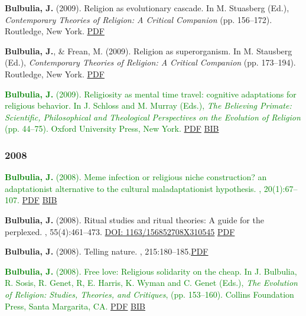 \documentclass{article}
\begin{document}
\begin{thebibliography}{99}
{\bf Bulbulia, J.} (2009).
\newblock Religion as evolutionary cascade.
\newblock In M. Stuasberg (Ed.), {\em Contemporary Theories of Religion: A
  Critical Companion} (pp. 156--172). Routledge, New York. \href{http://db.tt/OLFGqFk}{PDF}


{\bf Bulbulia, J.}, \& Frean, M. (2009).
\newblock Religion as superorganism.
\newblock In M. Stausberg (Ed.), {\em Contemporary Theories of Religion: A
  Critical Companion} (pp. 173--194). Routledge, New York. \href{http://db.tt/LMShwLD}{PDF}


\textcolor{Green}{{\bf Bulbulia, J.} (2009).
\newblock Religiosity as mental time travel: cognitive adaptations for
  religious behavior.
\newblock In J. Schloss and M. Murray (Eds.), {\em The Believing Primate:
  Scientific, Philosophical and Theological Perspectives on the Evolution of
  Religion} (pp. 44--75). Oxford University Press, New York. } \href{http://db.tt/gGUysok}{PDF} \href{https://www.dropbox.com/s/ri6hs7gbut6ku1f/2009.mentalTime.bib?dl=0}{BIB}



\subsubsection*{2008}




 \textcolor{Green}{{\bf Bulbulia, J.} (2008).
\newblock Meme infection or religious niche construction? an adaptationist
  alternative to the cultural maladaptationist hypothesis.
, 20(1):67--107.} \href{http://db.tt/6IjKsQV}{PDF} \href{https://scholar.google.co.nz/scholar.bib?q=info:7ZPnl0WG0EkJ:scholar.google.com/&output=citation&scisig=AAGBfm0AAAAAVQSUw7EcGrYvW0TZ0foofELIVjbg3S2W&scisf=4&hl=en}{BIB}


{\bf Bulbulia, J.} (2008).
\newblock Ritual studies and ritual theories: A guide for the perplexed.
, 55(4):461--473.  
\href{https://doi.org/1163/156852708X310545}{DOI: 1163/156852708X310545} \href{http://booksandjournals.brillonline.com/content/journals/10.1163/156852708x310545}{PDF}


{\bf Bulbulia, J.} (2008).
\newblock Telling nature.
, 215:180--185.\href{http://db.tt/MCbgvBt}{PDF}


\textcolor{Green}{
{\bf Bulbulia, J.} (2008).
\newblock Free love: Religious solidarity on the cheap.
\newblock In J. Bulbulia, R. Sosis, R. Genet, R, E. Harris, K. Wyman and
  C. Genet (Eds.), {\em The Evolution of Religion: Studies, Theories, and
  Critiques}, (pp. 153--160). Collins Foundation Press, Santa
  Margarita, CA.} \href{http://db.tt/8vbZ8wQ}{PDF}  \href{https://www.dropbox.com/s/57zbcpj8llfrlgy/freeLove.bib?dl=0}{BIB}
  


\end{thebibliography}
\end{document}
